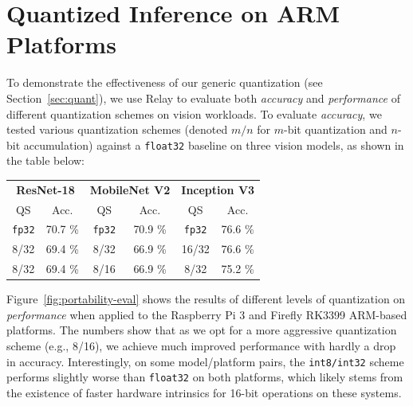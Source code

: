   \section{Quantized Inference on ARM Platforms}
  To demonstrate the effectiveness of our generic quantization (see Section~\ref{sec:quant}),
    we use Relay to evaluate both \textit{accuracy} and \textit{performance} of different
    quantization schemes on vision workloads.
  To evaluate \textit{accuracy},
    we tested various quantization schemes
    (denoted $m/n$ for $m$-bit quantization and $n$-bit accumulation)
    against a \texttt{float32} baseline on three vision models,
    as shown in the table below:
  \begin{center}
    \begin{tabular}{|c|c||c|c||c|c|}
      \hline
      \multicolumn{2}{|c}{\textbf{ResNet-18}} & \multicolumn{2}{c}{\textbf{MobileNet V2}} & \multicolumn{2}{c|}{\textbf{Inception V3}} \\
      \multicolumn{1}{|c}{QS}    & \multicolumn{1}{c}{Acc.}   &  \multicolumn{1}{c}{QS}  & \multicolumn{1}{c}{Acc.}  & \multicolumn{1}{c}{QS}  & \multicolumn{1}{c|}{Acc.} \\
      \hline
      \texttt{fp32} & 70.7 \%    & \texttt{fp32} & 70.9 \%       & \texttt{fp32} & 76.6 \% \\
      8/32         & 69.4 \%    & 8/32         & 66.9 \%       & 16/32        & 76.6 \% \\
      8/32         & 69.4 \%    & 8/16         & 66.9 \%       & 8/32         & 75.2 \% \\
      \hline
    \end{tabular}
  \end{center}
  Figure~\ref{fig:portability-eval} shows the results of different
    levels of quantization on \textit{performance} when applied to the Raspberry Pi 3
    and Firefly RK3399 ARM-based platforms.
  The numbers show that as we opt for a more aggressive quantization scheme
    (e.g., 8/16),
    we achieve much improved performance with hardly a drop in accuracy.
  Interestingly,
    on some model/platform pairs,
    the \texttt{int8/int32} scheme performs slightly worse than \texttt{float32} on both platforms,
    which likely stems from the existence of faster hardware intrinsics for 16-bit operations on these systems.

